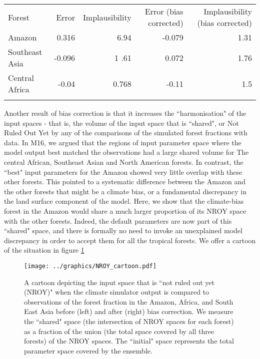 \documentclass[gmd, manuscript]{copernicus}
\begin{document}
\begin{table*}[t]
\caption{.}
\begin{tabular}{lrrrr}
\tophline

Forest                & Error &    Implausibility &  Error (bias corrected) &   Implausibility (bias corrected) \\
\middlehline
Amazon                &       0.316 &         6.94    &    -0.079  &    1.31  \\
Southeast Asia      &      -0.096   &   1       .61 &  0.072      &   1.76\\
Central Africa          & -0.04  &         0.768        & -0.11    & 1.5       \\
\bottomhline
\end{tabular}
\belowtable{} %
\label{tab:default_implausibility}
\end{table*}

Another result of bias correction is that it increases the ``harmonisation" of the input spaces - that is, the volume of the input space that is ``shared", or Not Ruled Out Yet by any of the comparisons of the simulated forest fractions with data. In M16, we argued that the regions of input parameter space where the model output best matched the observations had a large shared volume for The central African, Southeast Asian and North American forests. In contrast, the ``best" input parameters for the Amazon showed very little overlap with these other forests. This pointed to a systematic difference between the Amazon and the other forests that might be a climate bias, or a fundamental discrepancy in the land surface component of the model. Here, we show that the climate-bias forest in the Amazon would share a much larger proportion of its NROY space with the other forests. Indeed, the default parameters are now part of this ``shared" space, and there is formally no need to invoke an unexplained model discrepancy in order to accept them for all the tropical forests. We offer a cartoon of the situation in figure \ref{fig:NROY_cartoon}

\begin{figure}[t]
\texttt{[image: ../graphics/NROY\_cartoon.pdf]}
\caption{A cartoon depicting the input space that is ``not ruled out yet (NROY)" when the climate simulator output is compared to observations of the forest fraction in the Amazon, Africa, and South East Asia before (left) and after (right) bias correction. We measure the ``shared" space (the intersection of NROY spaces for each forest) as a fraction of the union (the total space covered by all three forests) of the NROY spaces. The ``initial" space represents the total parameter space covered by the ensemble.
}
\label{fig:NROY_cartoon}
\end{figure}
\end{document}
